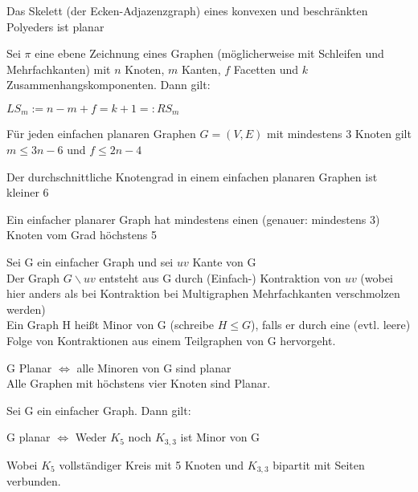 \documentclass[14pt]{article}
\begin{document}
\begin{eigenschaft}
    Das Skelett (der Ecken-Adjazenzgraph) eines konvexen und beschränkten Polyeders ist planar
\end{eigenschaft}
\begin{definition}
    Sei $\pi$ eine ebene Zeichnung eines Graphen (möglicherweise mit Schleifen und
    Mehrfachkanten) mit $n$ Knoten, $m$ Kanten, $f$ Facetten und $k$ Zusammenhangskomponenten.
    Dann gilt:
    \begin{center}
        $LS_m := n - m + f = k + 1 =: RS_m$
    \end{center}
\end{definition}
\begin{eigenschaft}
    Für jeden einfachen planaren Graphen $G = (V, E)$ mit mindestens 3 Knoten gilt
    $m \leq 3n - 6$ und $f \leq 2n - 4$ 
\end{eigenschaft}
\begin{eigenschaft}
    Der durchschnittliche Knotengrad in einem einfachen planaren Graphen ist kleiner 6
\end{eigenschaft}
\begin{eigenschaft}
    Ein einfacher planarer Graph hat mindestens einen (genauer: mindestens 3)
    Knoten vom Grad höchstens 5
\end{eigenschaft}
\begin{definition}
    Sei G ein einfacher Graph und sei $uv$ Kante von G \\
    Der Graph $G \backslash uv$ entsteht aus G durch (Einfach-)
    Kontraktion von $uv$ (wobei hier anders als bei Kontraktion bei Multigraphen
    Mehrfachkanten verschmolzen werden) \\
    Ein Graph H heißt Minor von G (schreibe $H \leq G$), falls er durch eine 
    (evtl. leere) Folge von Kontraktionen aus einem Teilgraphen von G hervorgeht.
\end{definition}
\begin{eigenschaft}
    \begin{center}
        G Planar $\Leftrightarrow$ alle Minoren von G sind planar \\
        Alle Graphen mit höchstens vier Knoten sind Planar.
    \end{center}
\end{eigenschaft}
\begin{definition}
    Sei G ein einfacher Graph. Dann gilt: \\
    \begin{center}
        G planar $\Leftrightarrow$ Weder $K_5$ noch $K_{3, 3}$ ist Minor von G
    \end{center}
    Wobei $K_5$ vollständiger Kreis mit 5 Knoten und $K_{3, 3}$ bipartit mit Seiten verbunden.
\end{definition}
\end{document}
